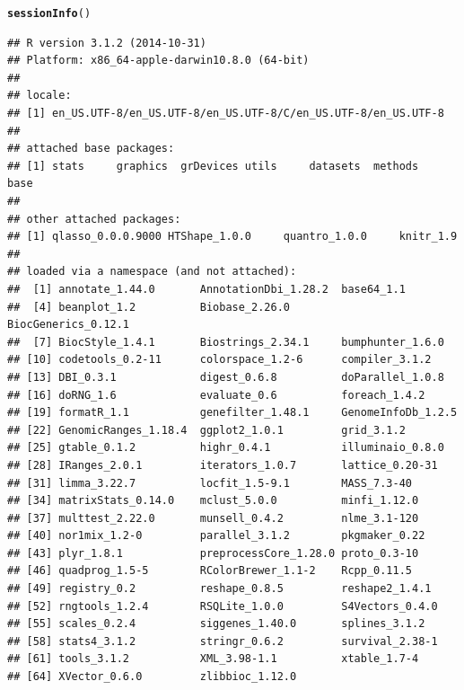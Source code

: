 \documentclass{article}\usepackage[]{graphicx}\usepackage[usenames,dvipsnames]{color}
\makeatletter
\newcommand{\hlstd}[1]{\textcolor[rgb]{0.345,0.345,0.345}{#1}}%
\newcommand{\hlkwd}[1]{\textcolor[rgb]{0.737,0.353,0.396}{\textbf{#1}}}%
\newenvironment{kframe}{%
 \def\at@end@of@kframe{}%
 \ifinner\ifhmode%
  \def\at@end@of@kframe{\end{minipage}}%
  \begin{minipage}{\columnwidth}%
 \fi\fi%
 \def\FrameCommand##1{\hskip\@totalleftmargin \hskip-\fboxsep
 \colorbox{shadecolor}{##1}\hskip-\fboxsep
     \hskip-\linewidth \hskip-\@totalleftmargin \hskip\columnwidth}%
 \MakeFramed {\advance\hsize-\width
   \@totalleftmargin\z@ \linewidth\hsize
   \@setminipage}}%
 {\par\unskip\endMakeFramed%
 \at@end@of@kframe}
\newenvironment{knitrout}{}{} %
\makeatother
\begin{document}
\begin{knitrout}
\color{fgcolor}\begin{kframe}
\begin{alltt}
\hlkwd{sessionInfo}\hlstd{()}
\end{alltt}
\begin{verbatim}
## R version 3.1.2 (2014-10-31)
## Platform: x86_64-apple-darwin10.8.0 (64-bit)
## 
## locale:
## [1] en_US.UTF-8/en_US.UTF-8/en_US.UTF-8/C/en_US.UTF-8/en_US.UTF-8
## 
## attached base packages:
## [1] stats     graphics  grDevices utils     datasets  methods   base     
## 
## other attached packages:
## [1] qlasso_0.0.0.9000 HTShape_1.0.0     quantro_1.0.0     knitr_1.9        
## 
## loaded via a namespace (and not attached):
##  [1] annotate_1.44.0       AnnotationDbi_1.28.2  base64_1.1           
##  [4] beanplot_1.2          Biobase_2.26.0        BiocGenerics_0.12.1  
##  [7] BiocStyle_1.4.1       Biostrings_2.34.1     bumphunter_1.6.0     
## [10] codetools_0.2-11      colorspace_1.2-6      compiler_3.1.2       
## [13] DBI_0.3.1             digest_0.6.8          doParallel_1.0.8     
## [16] doRNG_1.6             evaluate_0.6          foreach_1.4.2        
## [19] formatR_1.1           genefilter_1.48.1     GenomeInfoDb_1.2.5   
## [22] GenomicRanges_1.18.4  ggplot2_1.0.1         grid_3.1.2           
## [25] gtable_0.1.2          highr_0.4.1           illuminaio_0.8.0     
## [28] IRanges_2.0.1         iterators_1.0.7       lattice_0.20-31      
## [31] limma_3.22.7          locfit_1.5-9.1        MASS_7.3-40          
## [34] matrixStats_0.14.0    mclust_5.0.0          minfi_1.12.0         
## [37] multtest_2.22.0       munsell_0.4.2         nlme_3.1-120         
## [40] nor1mix_1.2-0         parallel_3.1.2        pkgmaker_0.22        
## [43] plyr_1.8.1            preprocessCore_1.28.0 proto_0.3-10         
## [46] quadprog_1.5-5        RColorBrewer_1.1-2    Rcpp_0.11.5          
## [49] registry_0.2          reshape_0.8.5         reshape2_1.4.1       
## [52] rngtools_1.2.4        RSQLite_1.0.0         S4Vectors_0.4.0      
## [55] scales_0.2.4          siggenes_1.40.0       splines_3.1.2        
## [58] stats4_3.1.2          stringr_0.6.2         survival_2.38-1      
## [61] tools_3.1.2           XML_3.98-1.1          xtable_1.7-4         
## [64] XVector_0.6.0         zlibbioc_1.12.0
\end{verbatim}
\end{kframe}
\end{knitrout}
\end{document}
